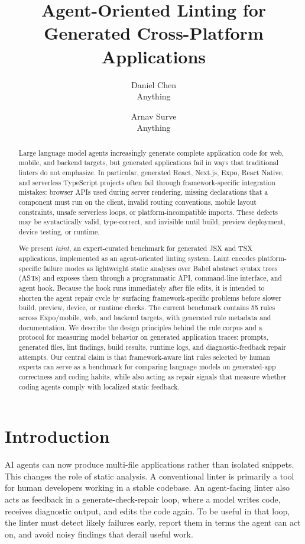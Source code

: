 \documentclass[11pt]{article}
\title{Agent-Oriented Linting for Generated Cross-Platform Applications}
\author{Daniel Chen \\ Anything \and Arnav Surve \\ Anything}
\date{}
\begin{document}
\maketitle

\begin{abstract}
Large language model agents increasingly generate complete application code for web, mobile, and backend targets, but generated applications fail in ways that traditional linters do not emphasize. In particular, generated React, Next.js, Expo, React Native, and serverless TypeScript projects often fail through framework-specific integration mistakes: browser APIs used during server rendering, missing declarations that a component must run on the client, invalid routing conventions, mobile layout constraints, unsafe serverless loops, or platform-incompatible imports. These defects may be syntactically valid, type-correct, and invisible until build, preview deployment, device testing, or runtime.

We present \emph{laint}, an expert-curated benchmark for generated JSX and TSX applications, implemented as an agent-oriented linting system. Laint encodes platform-specific failure modes as lightweight static analyses over Babel abstract syntax trees (ASTs) and exposes them through a programmatic API, command-line interface, and agent hook. Because the hook runs immediately after file edits, it is intended to shorten the agent repair cycle by surfacing framework-specific problems before slower build, preview, device, or runtime checks. The current benchmark contains 55 rules across Expo/mobile, web, and backend targets, with generated rule metadata and documentation. We describe the design principles behind the rule corpus and a protocol for measuring model behavior on generated application traces: prompts, generated files, lint findings, build results, runtime logs, and diagnostic-feedback repair attempts. Our central claim is that framework-aware lint rules selected by human experts can serve as a benchmark for comparing language models on generated-app correctness and coding habits, while also acting as repair signals that measure whether coding agents comply with localized static feedback.
\end{abstract}

\section{Introduction}

AI agents can now produce multi-file applications rather than isolated snippets. This changes the role of static analysis. A conventional linter is primarily a tool for human developers working in a stable codebase. An agent-facing linter also acts as feedback in a generate-check-repair loop, where a model writes code, receives diagnostic output, and edits the code again. To be useful in that loop, the linter must detect likely failures early, report them in terms the agent can act on, and avoid noisy findings that derail useful work.
\end{document}
